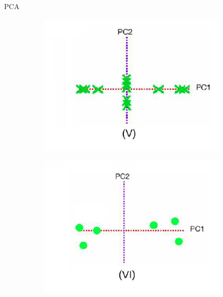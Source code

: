 \begin{frame}{PCA}
\begin{figure}
\begin{subfigure}{0.3\textwidth}
            \includegraphics[width=\linewidth]{fig/ch2-pca-steps-05.png}
        \end{subfigure} \pause
        \begin{subfigure}{0.3\textwidth}
            \centering
            \includegraphics[width=\linewidth]{fig/ch2-pca-steps-06.png}
        \end{subfigure}
    \end{figure}
\end{frame}